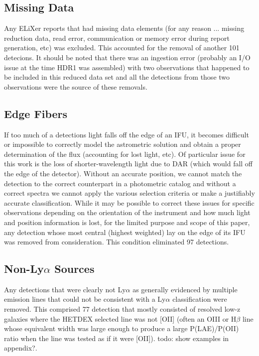 \documentclass{aastex62}
\begin{document}
 \subsection{Missing Data}
 Any ELiXer reports that had missing data elements (for any reason ... missing reduction data, read error, communication or memory error during report generation, etc) was excluded. This accounted for the removal of another 101 detecions. It should be noted that there was an ingestion error (probably an I/O issue at the time HDR1 was assembled) with two observations that happened to be included in this reduced data set and all the detections from those two observations were the source of these removals. 
 
\subsection{Edge Fibers}
If too much of a detections light falls off the edge of an IFU, it becomes difficult or impossible to correctly model the astrometric solution and obtain a proper determination of the flux (accounting for lost light, etc). Of particular issue for this work is the loss of shorter-wavelength light due to DAR (which would fall off the edge of the detector). Without an accurate position, we cannot match the detection to the correct counterpart in a photometric catalog and without a correct spectra we cannot apply the various selection criteria or make a justifiably accurate classification. While it may be possible to correct these issues for specific observations depending on the orientation of the instrument and how much light and position information is lost, for the limited purpose and scope of this paper, any detection whose most central (highest weighted) lay on the edge of its IFU was removed from consideration. This condition eliminated 97 detections. 

\subsection{Non-Ly$\alpha$ Sources}
Any detections that were clearly not Ly$\alpha$ as generally evidenced by multiple emission lines that could not be consistent with a Ly$\alpha$ classification were removed. This comprised 77 detection that mostly consisted of resolved low-z galaxies where the HETDEX selected line was not [OII] (often an OIII or H$\beta$ line whose equivalent width was large enough to produce a large P(LAE)/P(OII) ratio when the line was tested as if it were [OII]).
{ \color{red} todo: show examples in appendix?}.  
\end{document}
